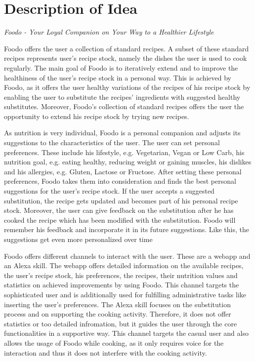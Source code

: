 \chapter{Description of Idea}
\begin{center}
\textit{Foodo - Your Loyal Companion on Your Way to a Healthier Lifestyle}
\end{center}

Foodo offers the user a collection of standard recipes. A subset of these standard recipes represents user's recipe stock, namely the dishes the user is used to cook regularly. The main goal of Foodo is to iteratively extend and to improve the healthiness of the user's recipe stock in a personal way. This is achieved by Foodo, as it offers the user healthy variations of the recipes of his recipe stock by enabling the user to substitute the recipes' ingredients with suggested healthy substitutes. Moreover, Foodo's collection of standard recipes offers the user the opportunity to extend his recipe stock by trying new recipes. 

As nutrition is very individual, Foodo is a personal companion and adjusts its suggestions to the characteristics of the user. The user can set personal preferences. These include his lifestyle, e.g. Vegetarian, Vegan or Low Carb, his nutrition goal, e.g. eating healthy, reducing weight or gaining muscles, his dislikes and his allergies, e.g. Gluten, Lactose or Fructose. After setting these personal preferences, Foodo takes them into consideration and finds the best personal suggestions for the user's recipe stock. If the user accepts a suggested substitution, the recipe gets updated and becomes part of his personal recipe stock. Moreover, the user can give feedback on the substitution after he has cooked the recipe which has been modified with the substitution. Foodo will remember his feedback and incorporate it in its future suggestions. Like this, the suggestions get even more personalized over time

Foodo offers different channels to interact with the user. These are a webapp and an Alexa skill. The webapp offers detailed information on the available recipes, the user's recipe stock, his preferences, the recipes, their nutrition values and statistics on achieved improvements by using Foodo. This channel targets the sophisticated user and is additionally used for fulfilling administrative tasks like inserting the user's preferences. The Alexa skill focuses on the substitution process and on supporting the cooking activity. Therefore, it does not offer statistics or too detailed infromation, but it guides the user through the core functionalities in a supportive way. This channel targets the casual user and also allows the usage of Foodo while cooking, as it only requires voice for the interaction and thus it does not interfere with the cooking activity.


